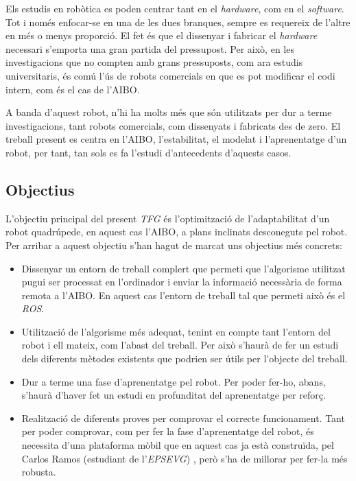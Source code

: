 \documentclass[12pt,a4paper,final,twoside]{article}
\begin{document}
Els estudis en robòtica es poden centrar tant en el \textit{hardware}, com en el \textit{software}. Tot i només enfocar-se en una de les dues branques, sempre es requereix de l'altre en més o menys proporció. El fet és que el dissenyar i fabricar el \textit{hardware} necessari s'emporta una gran partida del pressupost. Per això, en les investigacions que no compten amb grans pressuposts, com ara estudis universitaris, és comú l'ús de robots comercials en que es pot modificar el codi intern, com és el cas de l'AIBO.

A banda d'aquest robot, n'hi ha molts més que són utilitzats per dur a terme investigacions, tant robots comercials, com dissenyats i fabricats des de zero. El treball present es centra en l'AIBO, l'estabilitat, el modelat i l'aprenentatge d'un robot, per tant, tan sols es fa l'estudi d'antecedents d'aquests casos.


\subsection{Objectius}
\label{Objectius}

L'objectiu principal del present \textit{TFG} és l'optimització de l'adaptabilitat d'un robot quadrúpede, en aquest cas l'AIBO, a plans inclinats desconeguts pel robot. Per arribar a aquest objectiu s'han hagut de marcat uns objectius més concrets:
\begin{itemize}
\item Dissenyar un entorn de treball complert que permeti que l'algorisme utilitzat pugui ser processat en l'ordinador i enviar la informació necessària de forma remota a l'AIBO. En aquest cas l'entorn de treball tal que permeti això és el \textit{ROS}.
\item Utilització de l'algorisme més adequat, tenint en compte tant l'entorn del robot i ell mateix, com l'abast del treball. Per això s'haurà de fer un estudi dels diferents mètodes existents que podrien ser útils per l'objecte del treball.
\item Dur a terme una fase d'aprenentatge pel robot. Per poder fer-ho, abans, s'haurà d'haver fet un estudi en profunditat del aprenentatge per reforç.
\item Realització de diferents proves per comprovar el correcte funcionament. Tant per poder comprovar, com per fer la fase d'aprenentatge del robot, és necessita d'una plataforma mòbil que en aquest cas ja està construïda, pel Carlos Ramos (estudiant de l'\textit{EPSEVG}) \cite{TFG_Carlos_Ramos}, però s'ha de millorar per fer-la més robusta.
\end{itemize}
\end{document}
